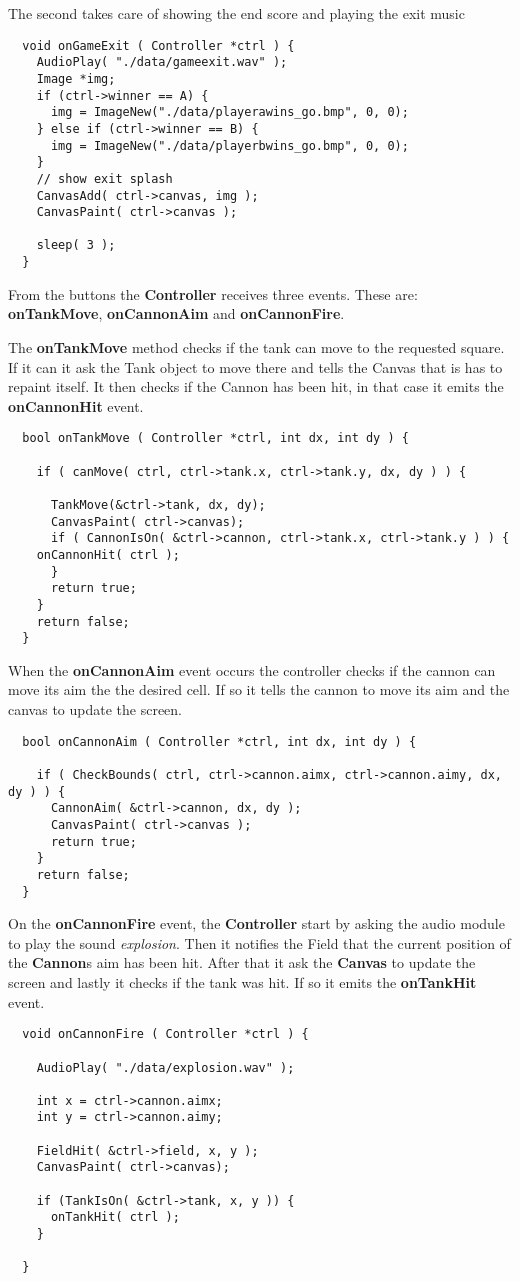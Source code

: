 The second takes care of showing the end score and playing the exit music
\begin{lstlisting}
  void onGameExit ( Controller *ctrl ) {
    AudioPlay( "./data/gameexit.wav" );
    Image *img;
    if (ctrl->winner == A) {
      img = ImageNew("./data/playerawins_go.bmp", 0, 0);
    } else if (ctrl->winner == B) {
      img = ImageNew("./data/playerbwins_go.bmp", 0, 0);
    }
    // show exit splash
    CanvasAdd( ctrl->canvas, img );
    CanvasPaint( ctrl->canvas );

    sleep( 3 );
  }
\end{lstlisting}

From the buttons the {\bf Controller} receives three events. These are: {\bf onTankMove},
{\bf onCannonAim} and {\bf onCannonFire}.

The {\bf onTankMove} method checks if the tank can move to the requested square. If it
can it ask the Tank object to move there and tells the Canvas that is has to repaint itself.
It then checks if the Cannon has been hit, in that case it emits the {\bf onCannonHit} event.
\begin{lstlisting}
  bool onTankMove ( Controller *ctrl, int dx, int dy ) {

    if ( canMove( ctrl, ctrl->tank.x, ctrl->tank.y, dx, dy ) ) {

      TankMove(&ctrl->tank, dx, dy);
      CanvasPaint( ctrl->canvas);
      if ( CannonIsOn( &ctrl->cannon, ctrl->tank.x, ctrl->tank.y ) ) {
	onCannonHit( ctrl );
      }
      return true;
    }
    return false;
  }
\end{lstlisting}

When the {\bf onCannonAim} event occurs the controller checks if the cannon can move its
aim the the desired cell. If so it tells the cannon to move its aim and the canvas to update
the screen.

\begin{lstlisting}
  bool onCannonAim ( Controller *ctrl, int dx, int dy ) {

    if ( CheckBounds( ctrl, ctrl->cannon.aimx, ctrl->cannon.aimy, dx, dy ) ) {
      CannonAim( &ctrl->cannon, dx, dy );
      CanvasPaint( ctrl->canvas );
      return true;
    }
    return false;
  }
\end{lstlisting}

On the {\bf onCannonFire} event, the {\bf Controller} start by asking the audio module to play the
sound {\it explosion}. Then it notifies the Field that the current position of the {\bf Cannon}s aim
has been hit. After that it ask the {\bf Canvas} to update the screen and lastly it checks if the
tank was hit. If so it emits the {\bf onTankHit} event.
\begin{lstlisting}
  void onCannonFire ( Controller *ctrl ) {

    AudioPlay( "./data/explosion.wav" );

    int x = ctrl->cannon.aimx;
    int y = ctrl->cannon.aimy;

    FieldHit( &ctrl->field, x, y );
    CanvasPaint( ctrl->canvas);

    if (TankIsOn( &ctrl->tank, x, y )) {
      onTankHit( ctrl );
    }

  }
\end{lstlisting}

